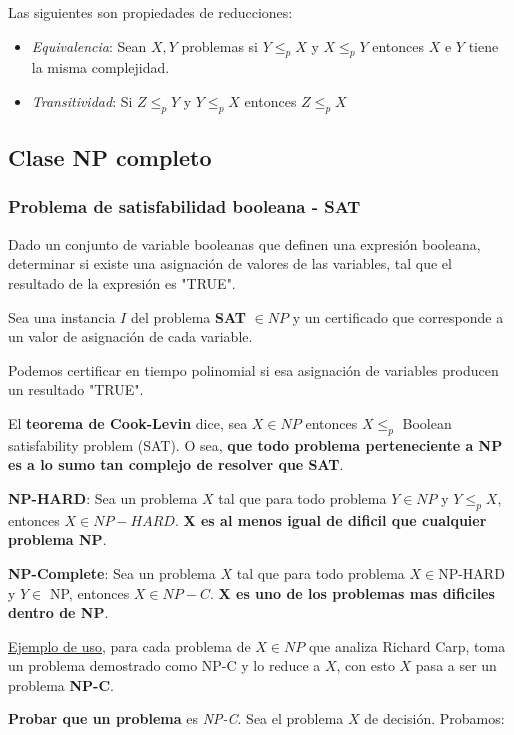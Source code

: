 \documentclass{article}
\begin{document}
Las siguientes son propiedades de reducciones:

\begin{itemize}
    \item \textit{Equivalencia}: Sean \(X,Y\) problemas si \(Y \leq_p X\) y \(X \leq_p Y\) 
    entonces \(X\) e \(Y\) tiene la misma complejidad.
    \item \textit{Transitividad}: Si \(Z \leq_p Y\) y \(Y \leq_p X\) 
    entonces \(Z \leq_p X\)
\end{itemize}


\subsection{Clase NP completo}

\subsubsection{Problema de satisfabilidad booleana - SAT}
Dado un conjunto de variable booleanas que definen una expresión booleana, determinar si existe una
asignación de valores de las variables, tal que el resultado de la expresión es "TRUE".

Sea una instancia \(I\) del problema \textbf{SAT} \(\in NP\) y un certificado que corresponde a un valor
de asignación de cada variable.

Podemos certificar en tiempo polinomial si esa asignación de variables producen un resultado "TRUE".

El \textbf{teorema de Cook-Levin} dice, sea \(X \in NP\) entonces \(X \leq_p\) Boolean satisfability problem (SAT). 
O sea, \textbf{que todo problema perteneciente a NP es a lo sumo tan complejo de resolver que SAT}.
 
\textbf{NP-HARD}: Sea un problema \(X\) tal que para todo problema \(Y \in NP\) y \(Y \leq_p X\), entonces \(X \in NP-HARD\).
\textbf{X es al menos igual de dificil que cualquier problema NP}.

\textbf{NP-Complete}: Sea un problema \(X\) tal que para todo problema \(X \in\)NP-HARD y \(Y \in \) NP, entonces \(X \in NP-C\).
\textbf{X es uno de los problemas mas dificiles dentro de NP}.

\underline{Ejemplo de uso}, para cada problema de \(X \in NP\) que analiza Richard Carp, toma un problema 
demostrado como NP-C y lo reduce a \(X\), con esto \(X\) pasa a ser un problema \textbf{NP-C}.

\textbf{Probar que un problema} es \textit{NP-C}. Sea el problema \(X\) de decisión. Probamos:
\end{document}
